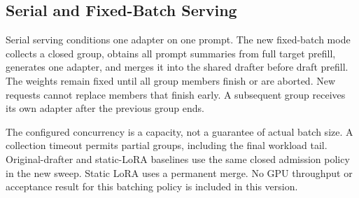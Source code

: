 \subsection{Serial and Fixed-Batch Serving}
Serial serving conditions one adapter on one prompt. The new fixed-batch mode
collects a closed group, obtains all prompt summaries from full target prefill,
generates one adapter, and merges it into the shared drafter before draft
prefill. The weights remain fixed until all group members finish or are aborted.
New requests cannot replace members that finish early. A subsequent group
receives its own adapter after the previous group ends.

The configured concurrency is a capacity, not a guarantee of actual batch size.
A collection timeout permits partial groups, including the final workload tail.
Original-drafter and static-LoRA baselines use the same closed admission policy
in the new sweep. Static LoRA uses a permanent merge. No GPU throughput or
acceptance result for this batching policy is included in this version.
